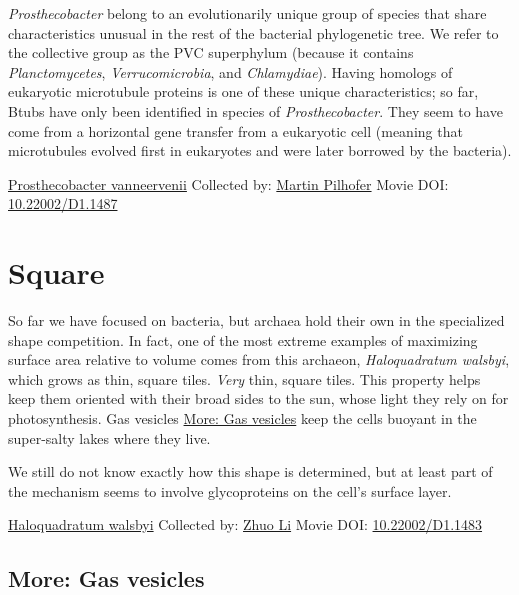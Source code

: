 \documentclass[]{tufte-book}
\begin{document}
\emph{Prosthecobacter} belong to an evolutionarily unique group of species that share characteristics unusual in the rest of the bacterial phylogenetic tree. We refer to the collective group as the PVC superphylum (because it contains \emph{Planctomycetes}, \emph{Verrucomicrobia}, and \emph{Chlamydiae}). Having homologs of eukaryotic microtubule proteins is one of these unique characteristics; so far, Btubs have only been identified in species of \emph{Prosthecobacter}. They seem to have come from a horizontal gene transfer from a eukaryotic cell (meaning that microtubules evolved first in eukaryotes and were later borrowed by the bacteria).



\hypertarget{htmlwidget-4c6387c1151d8e54afa1}{}

\label{fig:3-6a}\protect\hyperlink{tree}{Prosthecobacter vanneervenii} Collected by: \protect\hyperlink{martin_pilhofer}{Martin Pilhofer} Movie DOI: \href{https://doi.org/10.22002/D1.1487}{10.22002/D1.1487}

\hypertarget{square}{%
\section{Square}\label{square}}

So far we have focused on bacteria, but archaea hold their own in the specialized shape competition. In fact, one of the most extreme examples of maximizing surface area relative to volume comes from this archaeon, \emph{Haloquadratum walsbyi}, which grows as thin, square tiles. \emph{Very} thin, square tiles. This property helps keep them oriented with their broad sides to the sun, whose light they rely on for photosynthesis. Gas vesicles \protect\hyperlink{Gas_vesicles}{More: Gas vesicles} keep the cells buoyant in the super-salty lakes where they live.

We still do not know exactly how this shape is determined, but at least part of the mechanism seems to involve glycoproteins on the cell's surface layer.



\hypertarget{htmlwidget-4398b52ca3d7870c5f73}{}

\label{fig:3-7}\protect\hyperlink{tree}{Haloquadratum walsbyi} Collected by: \protect\hyperlink{zhuo_li}{Zhuo Li} Movie DOI: \href{https://doi.org/10.22002/D1.1483}{10.22002/D1.1483}

\hypertarget{Gas_vesicles}{%
\subsection*{More: Gas vesicles}\label{Gas_vesicles}}
\end{document}
